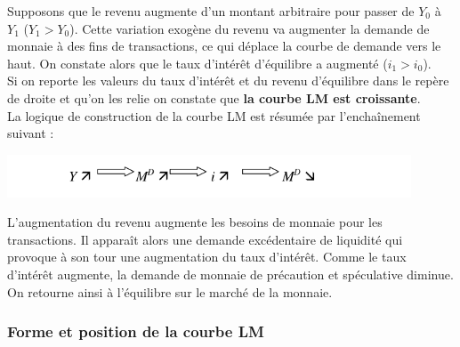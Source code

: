 \documentclass[10pt]{book}
\begin{document}
Supposons que le revenu augmente d'un montant arbitraire pour passer de $Y_0$ à $Y_1$ ($Y_1 > Y_0$). Cette variation exogène du revenu va augmenter la demande de monnaie à des fins de transactions, ce qui déplace la courbe de demande vers le haut. On constate alors que le taux d'intérêt d'équilibre a augmenté ($i_1 > i_0$). \\
Si on reporte les valeurs du taux d'intérêt et du revenu d'équilibre dans le repère de droite et qu'on les relie on constate que \textbf{la courbe LM est croissante}. \\
La logique de construction de la courbe LM est résumée par l'enchaînement suivant :
\begin{center}
  \includegraphics[width=12cm]{graph27.png}
\end{center}
L'augmentation du revenu augmente les besoins de monnaie pour les transactions. Il apparaît alors une demande excédentaire de liquidité qui provoque à son tour une augmentation du taux d'intérêt. Comme le taux d'intérêt augmente, la demande de monnaie de précaution et spéculative diminue. On retourne ainsi à l'équilibre sur le marché de la monnaie.
\subsubsection{Forme et position de la courbe LM}
\end{document}
